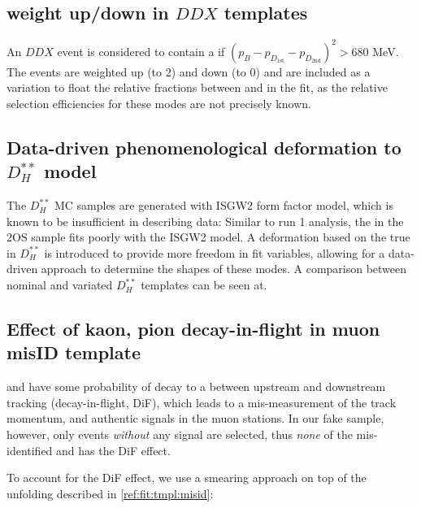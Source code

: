 \subsection{\Kstar weight up/down in $DDX$ templates}

An $DDX$ event is considered to contain a \Kstar if
$(p_B - p_{D_\text{1st}} - p_{D_\text{2nd}})^2 > 680$ MeV.
The \Kstar events are weighted up (to 2) and down (to 0) and are included as
a variation to float the relative fractions between \kaon and \Kstar in the fit,
as the relative selection efficiencies for these modes are not precisely known.


\subsection{Data-driven phenomenological deformation to $D_H^{**}$ model}

The $D_H^{**}$ MC samples are generated with ISGW2 form factor model, which
is known to be insufficient in describing data:
Similar to run 1 analysis, the \qSq in the 2OS sample fits poorly with the ISGW2
model.
A deformation based on the true \qSq
in $D_H^{**}$ is introduced to provide more freedom in fit variables,
allowing for a data-driven approach to determine the shapes of these modes.
A comparison between nominal and variated $D_H^{**}$ templates can be seen at.


\subsection{Effect of kaon, pion decay-in-flight in muon misID template}
\label{ref:fit:var:misid-dif}

\kaon and \pion have some probability of decay to a \muon between upstream and
downstream tracking (decay-in-flight, DiF),
which leads to a mis-measurement of the track momentum,
and authentic signals in the muon stations.
In our fake \muon sample, however, only events \emph{without} any \muon
signal are selected, thus \emph{none} of the mis-identified \kaon and \pion has
the DiF effect.

To account for the DiF effect, we use a smearing approach on top of the
unfolding described in \cref{ref:fit:tmpl:misid}:

